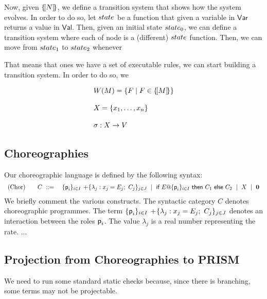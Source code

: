 Now, given $\{\![N]\!\}$, we define a transition system that shows how the
system evolves. In order to do so, let $\state$ be a function that
given a variable in $\mathsf{Var}$ returns a value in
$\mathsf{Val}$. Then, given an initial state $\state_0$, we can define
a transition system where each of node is a (different) $\state$
function. Then, we can move from $\state_1$ to $\state_2$ whenever

That means that ones we have a set of executable rules, we can start
building a transition system. In order to do so, we


\begin{displaymath}
  \begin{array}{lll}
    W(M) = \{F \mid F\in\{\![M]\!\}\}
    \\\\
    X = \{x_1,\ldots,x_n\}
    \\\\
    \sigma : X \rightarrow V
  \end{array}
\end{displaymath}




\newpage


\subsection{Choreographies}

 Our choreographic language is defined by the following
syntax:
%
\begin{displaymath}
  \begin{array}{lll}
    \text{(Chor)}  \quad & C \ ::=\
    & \{\textsf{p}_i\}_{i\in I}\,+\!\{\lambda_j: x_j=E_j;\ C_j\}_{j\in J}
      \ \mid\
      \textsf{if } E@\{\textsf{p}_i\}_{i\in I} \textsf{ then } C_1 \textsf{ else } C_2
      \ \mid\
      X
      \ \mid\
      \mathbf{0}
  \end{array}
\end{displaymath}
We briefly comment the various constructs. The syntactic category $C$
denotes choreographic programmes. The term
$\{\role p_i\}_{i\in I}\,+\!\{\lambda_j: x_j=E_j;\ C_j\}_{j\in J}$
denotes an interaction between the roles $\textsf{p}_i$. The value
$\lambda_j$ is a real number representing the rate. ...



\subsection{Projection from Choreographies to PRISM}
 We need to run some standard
static checks because, since there is branching, some terms may not be
projectable.
%


